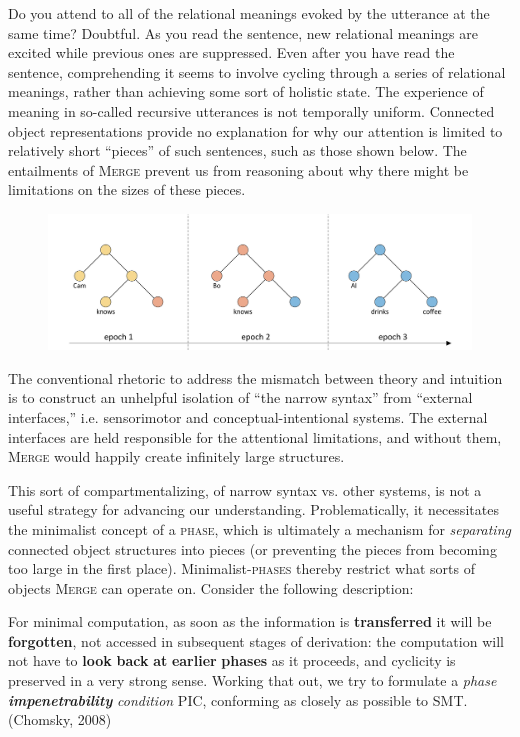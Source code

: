   Do you attend to all of the relational meanings evoked by the utterance at the same time? Doubtful. As you read the sentence, new relational meanings are excited while previous ones are suppressed. Even after you have read the sentence, comprehending it seems to involve cycling through a series of relational meanings, rather than achieving some sort of holistic state. The experience of meaning in so-called recursive utterances is not temporally uniform. Connected object representations provide no explanation for why our attention is limited to relatively short “pieces” of such sentences, such as those shown below. The entailments of \textsc{Merge} prevent us from reasoning about why there might be limitations on the sizes of these pieces.

  
\begin{figure}
\includegraphics[width=\textwidth]{figures/Tilsen-img111.png}
\caption{\missingcaption}
\label{fig:}
\end{figure}
 

  The conventional rhetoric to address the mismatch between theory and intuition is to construct an unhelpful isolation of “the narrow syntax” from “external interfaces,” i.e. sensorimotor and conceptual-intentional systems. The external interfaces are held responsible for the attentional limitations, and without them, \textsc{Merge} would happily create infinitely large structures. 

  This sort of compartmentalizing, of narrow syntax vs. other systems, is not a useful strategy for advancing our understanding. Problematically, it necessitates the minimalist concept of a \textsc{phase}, which is ultimately a mechanism for \textit{separating} connected object structures into pieces (or preventing the pieces from becoming too large in the first place). Minimalist-\textsc{phases} thereby restrict what sorts of objects \textsc{Merge} can operate on. Consider the following description:

For minimal computation, as soon as the information is \textbf{transferred} it will be \textbf{forgotten}, not accessed in subsequent stages of derivation: the computation will not have to \textbf{look} \textbf{back} \textbf{at} \textbf{earlier} \textbf{phases} as it proceeds, and cyclicity is preserved in a very strong sense. Working that out, we try to formulate a \textit{phase} \textbf{\textit{impenetrability}} \textit{condition} PIC, conforming as closely as possible to SMT. (Chomsky, 2008)

